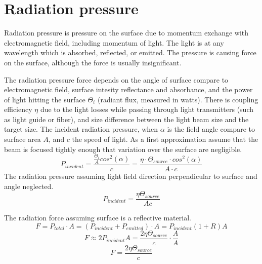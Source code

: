 \documentclass[\main/master.tex]{subfiles}
\begin{document}
\section{Radiation pressure}
Radiation pressure is pressure on the surface due to momentum exchange with electromagnetic field, including momentum of light. The light is at any wavelength which is absorbed, reflected, or emitted. The pressure is causing force on the surface, although the force is usually insignificant.
  
\par
The radiation pressure force depends on the angle of surface compare to electromagnetic field, surface intesity reflectance and absorbance, and the power of light hitting the surface $\Theta_i$ (radiant flux, measured in watts). There is coupling efficiency $\eta$ due to the light losses while passing through light transmitters (such as light guide or fiber), and size difference between the light beam size and the target size. The incident radiation pressure, when $\alpha$ is the field angle compare to surface area $A$, and $c$ the speed of light. As a first approximation assume that the beam is focused tightly enough that variation over the surface are negligible. 
\begin{equation}
P_{incident} = \frac{\frac{\Theta_i}{A}cos^2(\alpha)}{c} = \frac{\eta\cdot \Theta_{source}\cdot cos^2(\alpha)}{{A\cdot c}} \label{eqn:radiation_pressure}
\end{equation}
The radiation pressure assuming light field direction perpendicular to surface and angle neglected. 
\begin{equation}
P_{incident} = \frac{\eta\Theta_{source}}{{Ac}} \label{eqn:radiation_pressure_perpendicular}
\end{equation}

The radiation force assuming surface is a reflective material.
\begin{equation}
F = P_{total}\cdot A = (P_{incident}+P_{emitted})\cdot A = P_{incident}(1+R)A \label{eqn:radiation_force}
\end{equation}
\begin{equation}
F \approx 2P_{incident}A = \frac{2\eta\Theta_{source}}{{c}}\cdot \frac{A}{A} \label{eqn:radiation_force_reflective}
\end{equation}
\begin{equation}
F = \frac{2\eta\Theta_{source}}{{c}} \label{eqn:radiation_force_power}
\end{equation}
\end{document}
